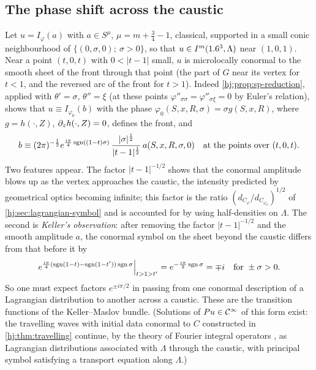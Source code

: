 \subsection{The phase shift across the caustic}
Let $u=I_\varphi(a)$ with $a\in S^{\mu}$, $\mu=m+\frac34-1$, classical, supported
in a small conic neighbourhood of $\{(0,\sigma,0);\ \sigma>0\}$, so that
$u\in I^{m}(1.6^3,\Lambda)$ near $(1,0,1)$.  Near a point $(t,0,t)$ with
$0<|t-1|$ small, $u$ is microlocally conormal to the smooth sheet of the front
through that point (the part of $G$ near its vertex for $t<1$, and the reversed
arc of the front for $t>1$).  Indeed \cref{hj:prop:sp-reduction}, applied with
$\theta'=\sigma$, $\theta''=\xi$ (at these points $\varphi''_{\sigma\sigma}=
\varphi''_{\sigma\xi}=0$ by Euler's relation), shows that $u\equiv I_{\varphi_0}(b)$
with the phase $\varphi_0(S,x,R,\sigma)=\sigma g(S,x,R)$, where $g=h(\cdot,Z)$,
$\partial_zh(\cdot,Z)=0$, defines the front, and
\begin{equation*}
  b\equiv(2\pi)^{-\frac12}e^{\frac{i\pi}4\operatorname{sgn}((1-t)\sigma)}\,
  \frac{|\sigma|^{\frac12}}{|t-1|^{\frac12}}\,a(S,x,R,\sigma,0)
  \quad\text{at the points over }(t,0,t).
\end{equation*}
Two features appear.  The factor $|t-1|^{-1/2}$ shows that the conormal
amplitude blows up as the vertex approaches the caustic, the intensity
predicted by geometrical optics becoming infinite; this factor is the ratio
$(d_{C_\varphi}/d_{C_{\varphi_0}})^{1/2}$ of
\cref{hj:sec:lagrangian-symbol} and is accounted for by using half-densities on
$\Lambda$.  The second is \emph{Keller's observation}: after removing the
factor $|t-1|^{-1/2}$ and the smooth amplitude $a$, the conormal symbol on the
sheet beyond the caustic differs from that before it by
\begin{equation*}
  e^{\frac{i\pi}4(\operatorname{sgn}(1-t)-\operatorname{sgn}(1-t'))\operatorname{sgn}\sigma}\Big|_{t>1>t'}=
  e^{-\frac{i\pi}2\operatorname{sgn}\sigma}=\mp i\quad\text{for }\pm\sigma>0 .
\end{equation*}
So one must expect factors $e^{\pm i\pi/2}$ in passing from one conormal
description of a Lagrangian distribution to another across a caustic.  These
are the transition functions of the Keller--Maslov bundle.  (Solutions of
$Pu\in\mathcal{C}^\infty$ of this form exist: the travelling waves with initial data conormal
to $C$ constructed in \cref{hj:thm:travelling} continue, by the theory of
Fourier integral operators \cite{Hormander-FIO}, as Lagrangian distributions associated with $\Lambda$
through the caustic, with principal symbol satisfying a transport equation
along $\Lambda$.)

